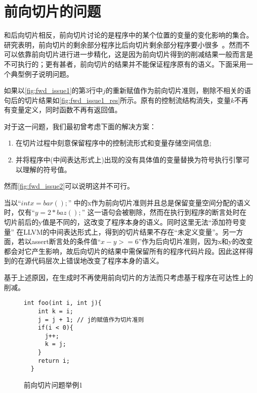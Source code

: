 \chapter{前向切片的问题}
\label{chap:fwd_issue}

和后向切片相反，前向切片讨论的是程序中的某个位置的变量的变化影响的集合。研究表明，前向切片的剩余部分程序比后向切片剩余部分程序要小很多~。然而\rbscope 不可以依靠前向切片进行进一步精化，这是因为前向切片得到的削减结果一般而言是不可执行的；更有甚者，前向切片的结果并不能保证程序原有的语义。下面采用一个典型例子说明问题。

如果以\autoref{fig:fwd_issue1}的第3行中$j$的重新赋值作为前向切片准则，剔除不相关的语句后的切片结果如\autoref{fig:fwd_issue1_res}所示。原有的控制流结构消失，变量$k$不再有变量定义，同时函数不再有返回值。

对于这一问题，我们最初曾考虑下面的解决方案：
\begin{enumerate}[label={(\arabic*)}]
\item 在切片过程中刻意保留程序中的控制流形式和变量存储空间信息;
\item 并将程序中(中间表达形式上)出现的没有具体值的变量替换为符号执行引擎可以理解的符号值。
\end{enumerate}
然而\autoref{fig:fwd_issue2}可以说明这并不可行。

当以“$int x = bar();$” 中的x作为前向切片准则并且总是保留变量空间分配的语义时，仅有“$y = 2 * baz();$” 这一语句会被剔除，然而在执行到程序的断言处时在切片前后的y值是不同的，这改变了程序本身的语义。同时这里无法“添加符号变量” \cndash 在LLVM的中间表达形式上，得到的切片结果不存在“未定义变量”。另一方面，若以assert断言处的条件值“$x-y>=6$”作为后向切片准则，因为x和y的改变都会对它产生影响，故后向切片的结果中需保留所有的程序代码片段。因此这样得到的\rbscope 在源代码层次上错误地改变了程序本身的语义。

基于上述原因，在生成\rbscope 时不再使用前向切片的方法而只考虑基于程序在可达性上的削减。

\begin{figure}[t]
\begin{center}
\begin{lstlisting}[language={[ANSI]C}]
  int foo(int i, int j){
    int k = i;
    j = j + 1; // j的赋值作为切片准则
    if(i < 0){
      j++;
      k = j;
    }
    return i;
  }
\end{lstlisting}
\vspace{-16pt}
\caption{前向切片问题举例1}
\label{fig:fwd_issue1}
\end{center}
\end{figure}

